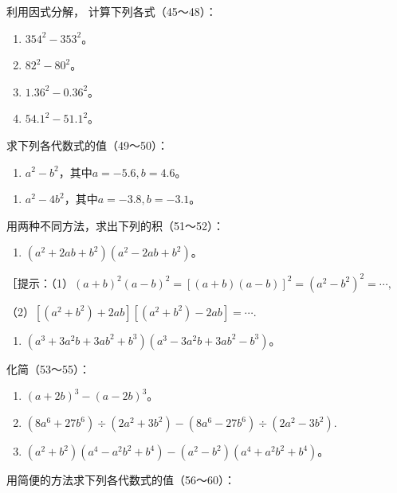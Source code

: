 利用因式分解， 计算下列各式（45～48）：

\begin{enumerate}[start=45]
\item
  \(354^{2} - 353^{2}\)。
\item
  \(82^{2} - 80^{2}\)。
\item
  \(1.36^{2} - 0.36^{2}\)。
\item
  \(54.1^{2} - 51.1^{2}\)。
\end{enumerate}

求下列各代数式的值（49～50）：

\begin{enumerate}[start=49]
\item
  \(a^2 - b^2\)，其中\(a = -5.6, b = 4.6\)。
\end{enumerate}

\begin{enumerate}[start=50]
\item
  \(a^2 - 4b^2\)，其中\(a = -3.8, b = -3.1\)。
\end{enumerate}

用两种不同方法，求出下列的积（51～52）：

\begin{enumerate}[start=51]
\item
  \((a^2 + 2ab + b^2)(a^2 - 2ab + b^2)\)。
\end{enumerate}

［提示：（1）\((a + b)^2 (a - b)^2 = [(a + b)(a - b)]^2 = (a^2 - b^2)^2 = \cdots,\)

（2）\(\left[(a^2 + b^2) + 2ab\right]\left[(a^2 + b^2) - 2ab\right] = \cdots.\)

\begin{enumerate}[start=52]
\item
  \((a^3 + 3a^2b + 3ab^2 + b^3)(a^3 - 3a^2b + 3ab^2 - b^3)\)。
\end{enumerate}

化简（53～55）：

\begin{enumerate}[start=53]
\item
  \((a + 2b)^{3} - (a - 2b)^{3}\)。
\item
  \((8a^{6} + 27b^{6})\div (2a^{2} + 3b^{2}) - (8a^{6} - 27b^{6})\div (2a^{2} - 3b^{2}).\)
\item
  \((a^2 + b^2)(a^4 - a^2b^2 + b^4) - (a^2 - b^2)(a^4 + a^2b^2 + b^4)\)。
\end{enumerate}

用简便的方法求下列各代数式的值（56～60）：

